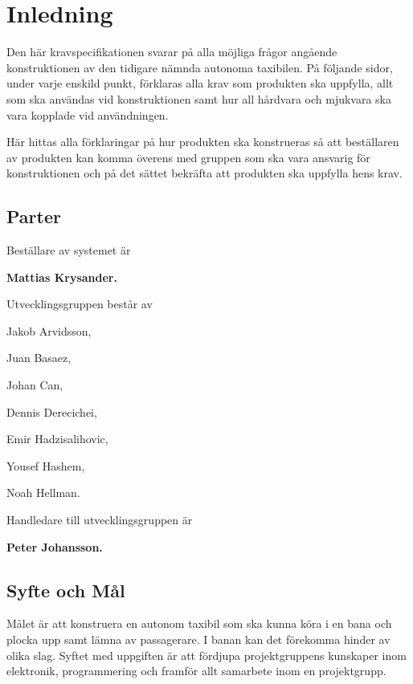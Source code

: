 \documentclass[kravspec/krav.tex]{subfiles}
\begin{document}
\section{Inledning}
Den här kravspecifikationen svarar på alla möjliga frågor angående
konstruktionen av den tidigare nämnda autonoma taxibilen. På följande sidor,
under varje enskild punkt, förklaras alla krav som produkten ska uppfylla,
allt som ska användas vid konstruktionen samt hur all hårdvara och mjukvara
ska vara kopplade vid användningen.

Här hittas alla förklaringar på  hur produkten ska konstrueras så att
beställaren av produkten kan komma överens med gruppen som ska vara
ansvarig för konstruktionen och på det sättet bekräfta att produkten ska
uppfylla hens krav.

\subsection{Parter}
Beställare av systemet är
\begin{list}{}
    \item \bfseries Mattias Krysander.
\end{list}\vspace{4mm}

\noindent
Utvecklingsgruppen består av
{\bfseries\begin{list}{}
   \item Jakob Arvidsson,
   \item Juan Basaez,
   \item Johan Can,
   \item Dennis Derecichei,
   \item Emir Hadzisalihovic,
   \item Yousef Hashem,
   \item Noah Hellman.
\end{list}}\vspace{4mm}

\noindent
Handledare till utvecklingsgruppen är
\begin{list}{}	
	\item \bfseries Peter Johansson.
\end{list}\vspace{4mm}

\subsection{Syfte och Mål}
Målet är att konstruera en autonom taxibil som ska kunna köra i en bana och
plocka upp samt lämna av passagerare. I banan kan det förekomma hinder av olika
slag. Syftet med uppgiften är att fördjupa projektgruppens kunskaper inom
elektronik, programmering och framför allt samarbete inom en projektgrupp.
\end{document}
